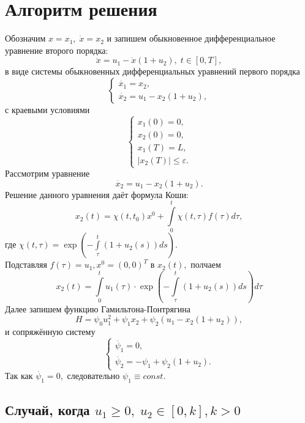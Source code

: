 \documentclass[11pt]{article}
\begin{document}
\section{Алгоритм решения}
	Обозначим $ x = x_1, \; \dot{x} = x_2 $ и запишем обыкновенное дифференциальное уравнение второго порядка:
	$$
		\ddot{x} = u_1 - \dot{x}(1 + u_2), \; t \in [0, T],
	$$
	в виде системы обыкновенных дифференциальных уравнений первого порядка
	\begin{equation}
		\label{odeSystem}
		\begin{cases}
   			\dot{x_1} = x_2, \\ 
   			\dot{x_2} = u_1 - x_2(1 + u_2),
 		\end{cases}
	\end{equation}
	с краевыми условиями
	\begin{equation*}
		\begin{cases}
   			x_1(0) = 0, \\
   			x_2(0) = 0, \\
   			x_1(T) = L, \\
   			\vert x_2(T) \vert \leqslant \varepsilon.
 		\end{cases}
	\end{equation*}
	Рассмотрим уравнение 
	$$
		\dot{x_2} = u_1 - x_2(1 + u_2). 
	$$
	Решение данного уравнения даёт формула Коши:
	$$
		x_2(t) = \chi(t, t_0)x^0 + \int \limits_0^t \chi(t, \tau)f(\tau) d\tau,
	$$
	где $ \chi(t, \tau) = \exp \left(- \int \limits_\tau^t (1 + u_2(s)) ds \right). $ \\
	Подставляя $ f(\tau) = u_1, x^0 = (0, 0)^T $ в $ x_2(t), $ полчаем
	\begin{equation}
	\label{x2(t)}
		x_2(t) = \int \limits_0^t u_1(\tau) \cdot \exp \left(- \int \limits_\tau^t (1 + u_2(s)) ds \right) d\tau
	\end{equation}
	Далее запишем функцию Гамильтона-Понтрягина
	$$
		H = \psi_0 u_1^2 + \psi_1 x_2 + \psi_2 (u_1 - x_2(1 + u_2)), 
	$$
	и сопряжённую систему
	\begin{equation}
		\label{conjSystem}
		\begin{cases}
			\dot{\psi_1} = 0, \\
			\dot{\psi_2} = - \psi_1 + \psi_2(1 + u_2).
   		\end{cases}
	\end{equation}
	Так как $ \dot{\psi_1} = 0, $ следовательно $ \psi_1 \equiv const. $
	
\subsection{Случай, когда $ u_1 \geqslant 0, \; u_2 \in [0, k], k > 0 $}
\end{document}
